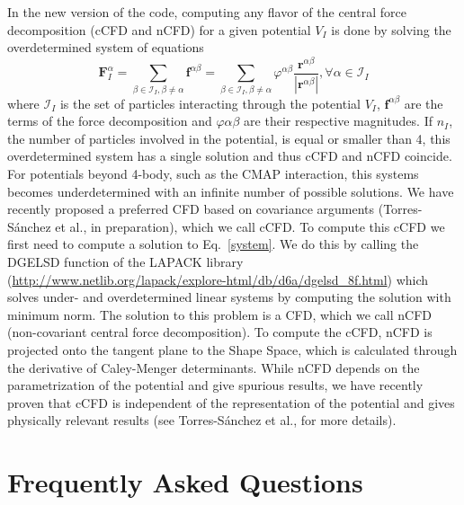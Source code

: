 \documentclass[10pt,letterpaper,notitlepage]{article}
\begin{document}
In the new version of the code, computing any flavor of the central force decomposition (cCFD and nCFD) for a given potential $V_I$ is done by solving the overdetermined system of equations
\begin{equation}
\label{system}
\bm{F}_I^\alpha = \sum_{\beta\in\mathcal{I}_I,\beta\neq\alpha}  \bm{f}^{\alpha\beta}= \sum_{\beta\in\mathcal{I}_I,\beta\neq\alpha}  \varphi^{\alpha\beta}\frac{\bm{r}^{\alpha\beta}}{|\bm{r}^{\alpha\beta}|}, \forall \alpha \in \mathcal{I}_I
\end{equation}
where $\mathcal{I}_I$ is the set of particles interacting through the potential $V_I$, $\bm{f}^{\alpha\beta}$ are the terms of the force decomposition and $\varphi{\alpha\beta}$ are their respective magnitudes. If $n_I$, the number of particles involved in the potential, is equal or smaller than 4, this overdetermined system has a single solution and thus cCFD and nCFD coincide. For potentials beyond 4-body, such as the CMAP interaction, this systems becomes underdetermined with an infinite number of possible solutions. We have recently proposed a preferred CFD based on covariance arguments (Torres-S\'anchez et al., in preparation), which we call cCFD. To compute this cCFD we first need to compute a solution to Eq.~\eqref{system}. We do this by calling the DGELSD function of the LAPACK library (\url{http://www.netlib.org/lapack/explore-html/db/d6a/dgelsd_8f.html}) which solves under- and overdetermined linear systems by computing the solution with minimum norm. The solution to this problem is a CFD, which we call nCFD (non-covariant central force decomposition). To compute the cCFD, nCFD is projected onto the tangent plane to the Shape Space, which is calculated through the derivative of Caley-Menger determinants. While nCFD depends on the parametrization of the potential and give spurious results, we have recently proven that cCFD is independent of the representation of the potential and gives physically relevant results (see Torres-S\'anchez et al., for more details). 

\section{Frequently Asked Questions}
\end{document}
